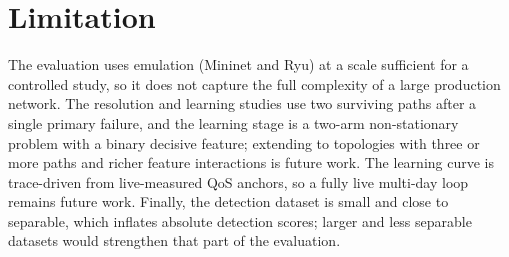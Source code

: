 \documentclass[12pt,a4paper]{report}
\begin{document}
\section{Limitation}
The evaluation uses emulation (Mininet and Ryu) at a scale sufficient for a controlled study,
so it does not capture the full complexity of a large production network. The resolution and
learning studies use two surviving paths after a single primary failure, and the learning
stage is a two-arm non-stationary problem with a binary decisive feature; extending to
topologies with three or more paths and richer feature interactions is future work. The
learning curve is trace-driven from live-measured QoS anchors, so a fully live multi-day loop
remains future work. Finally, the detection dataset is small and close to separable, which
inflates absolute detection scores; larger and less separable datasets would strengthen that
part of the evaluation.
\end{document}
